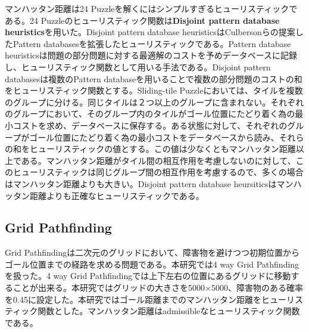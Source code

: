 \documentclass[uplatex]{jsarticle}
\begin{document}
マンハッタン距離は24 Puzzleを解くにはシンプルすぎるヒューリスティックである。24 Puzzleのヒューリスティック関数は\textbf{Disjoint pattern database heuristics}を用いた\cite{Korf2002}。Disjoint pattern database heuristicsはCulbersonらの提案したPattern databasesを拡張したヒューリスティックである。Pattern database heuristicsは問題の部分問題に対する最適解のコストを予めデータベースに記録し、ヒューリスティック関数として用いる手法である\cite{Culberson1998pattern}。Disjoint pattern databasesは複数のPattern databaseを用いることで複数の部分問題のコストの和をヒューリスティック関数とする。Sliding-tile Puzzleにおいては、タイルを複数のグループに分ける。同じタイルは２つ以上のグループに含まれない。それぞれのグループにおいて、そのグループ内のタイルがゴール位置にたどり着く為の最小コストを求め、データベースに保存する。ある状態に対して、それぞれのグループがゴール位置にたどり着く為の最小コストをデータベースから読み、それらの和をヒューリスティックの値とする。この値は少なくともマンハッタン距離以上である。マンハッタン距離がタイル間の相互作用を考慮しないのに対して、このヒューリスティックは同じグループ間の相互作用を考慮するので、多くの場合はマンハッタン距離よりも大きい。Disjoint pattern database heursiticsはマンハッタン距離よりも正確なヒューリスティックである。


\subsection{Grid Pathfinding}

Grid Pathfindingは二次元のグリッドにおいて、障害物を避けつつ初期位置からゴール位置までの経路を求める問題である。本研究では4 way Grid Pathfindingを扱った。4 way Grid Pathfindingでは上下左右の位置にあるグリッドに移動することが出来る。本研究ではグリッドの大きさを5000$\times$5000、障害物のある確率を0.45に設定した。本研究ではゴール距離までのマンハッタン距離をヒューリスティック関数とした。マンハッタン距離はadmissibleなヒューリスティック関数である。
\end{document}
